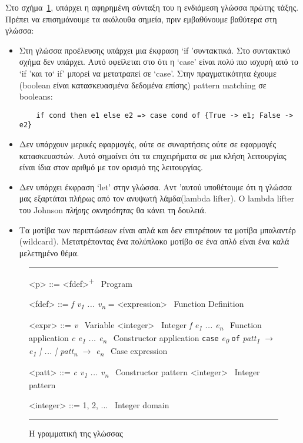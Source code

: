 \documentclass[diploma]{softlab-thesis}
\begin{document}
Στο σχήμα~\ref{fig:elgrammar}, υπάρχει η αφηρημένη σύνταξη του
η ενδιάμεση γλώσσα πρώτης τάξης.
Πρέπει να επισημάνουμε τα ακόλουθα σημεία, πριν εμβαθύνουμε βαθύτερα στη γλώσσα:
\begin{itemize}
  \item Στη γλώσσα προέλευσης υπάρχει μια έκφραση `if 'συντακτικά. Στο συντακτικό σχήμα δεν υπάρχει.
Αυτό οφείλεται στο ότι η `case' είναι πολύ πιο ισχυρή από το `if 'και το` if' μπορεί να μετατραπεί 
σε `case'. Στην πραγματικότητα έχουμε (boolean είναι κατασκευασμένα δεδομένα επίσης) pattern matching 
σε booleans:
\begin{verbatim}
    if cond then e1 else e2 => case cond of {True -> e1; False -> e2}
\end{verbatim}
\item Δεν υπάρχουν μερικές εφαρμογές, ούτε σε συναρτήσεις ούτε σε εφαρμογές κατασκευαστών.
Αυτό σημαίνει ότι τα επιχειρήματα σε μια κλήση λειτουργίας είναι ίδια στον αριθμό με τον ορισμό 
της λειτουργίας.
\item Δεν υπάρχει έκφραση `let' στην γλώσσα. Αντ 'αυτού υποθέτουμε ότι η γλώσσα μας εξαρτάται 
πλήρως από τον ανυψωτή λάμδα(lambda lifter). O lambda lifter του Johnson 
\textit{πλήρης οκνηρότητας} θα κάνει τη δουλειά.
\item Τα μοτίβα των περιπτώσεων είναι απλά και δεν επιτρέπουν τα μοτίβα μπαλαντέρ (wildcard). 
Μετατρέποντας ένα πολύπλοκο μοτίβο σε ένα απλό είναι ένα καλά μελετημένο θέμα.
\end{itemize}


\begin{figure}[t]
  \hrule
  \begin{grammar}
      <p> ::= <fdef>\textsuperscript{+} \hfill\ Program
  
      <fdef> ::= \textit{f v\textsubscript{1} ... v\textsubscript{n}} = <expression> \hfill\ Function Definition
  
      <expr> ::= \textit{v} \hfill\ Variable
      \alt <integer> \hfill\ Integer
      \alt \textit{f e\textsubscript{1} ... e\textsubscript{n}} \hfill\ Function application
      \alt \textit{c e\textsubscript{1} ... e\textsubscript{n}} \hfill\ Constructor application
      \alt \texttt{case} \textit{e\textsubscript{0}} \texttt{of} \textit{patt\textsubscript{1} $\rightarrow$ e\textsubscript{1} | ... | patt\textsubscript{n} $\rightarrow$ e\textsubscript{n}} \hfill\ Case expression
       
      <patt> ::= \textit{c v\textsubscript{1} ... v\textsubscript{n}} \hfill\ Constructor pattern
      \alt <integer> \hfill\ Integer pattern
  
      <integer> ::= 1, 2, ... \hfill\ Integer domain
  
  \end{grammar}
  \hrule
\caption{Η γραμματική της γλώσσας\label{fig:elgrammar}}
\end{figure}
\end{document}
